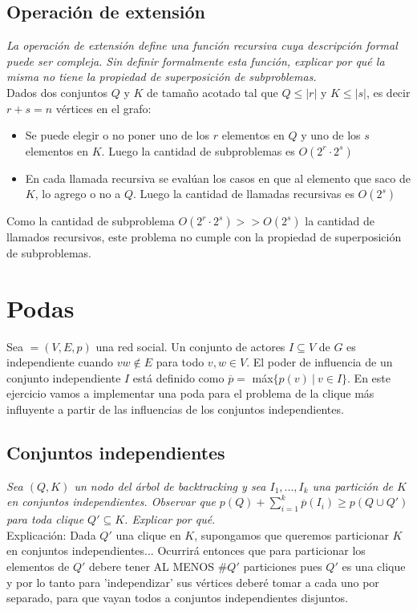 \documentclass[10pt, a4paper]{article}
\begin{document}
\subsection{Operación de extensión}
\emph{La operación de extensión define una función recursiva cuya descripción formal puede ser compleja. Sin definir formalmente esta función, explicar por qué la misma no tiene la propiedad de
superposición de subproblemas.} \\

Dados dos conjuntos $Q$ y $K$ de tamaño acotado tal que $Q \leq |r|$ y $K \leq |s|$, es decir $r+s = n$ vértices en el grafo:
\begin{itemize}
\item Se puede elegir o no poner uno de los $r$ elementos en $Q$ y uno de los $s$ elementos en $K$. Luego la cantidad de subproblemas es $O(2^r \cdot 2^s)$
\item En cada llamada recursiva se evalúan los casos en que al elemento que saco de $K$, lo agrego o no a $Q$. Luego la cantidad de llamadas recursivas es $O(2^s)$
\end{itemize}

Como la cantidad de subproblema $O(2^r \cdot 2^s) >> O(2^s)$ la cantidad de llamados recursivos, este problema no cumple con la propiedad de superposición de subproblemas.

\section{Podas}
Sea $ = (V, E, p)$ una red social. Un conjunto de actores $I \subseteq V$ de $G$ es independiente cuando
$vw \notin E$ para todo $v, w \in V$. El poder de influencia de un conjunto independiente $I$ está definido como
$\overline{p} =$ máx$\{p(v) \ | \ v \in I\}$. En este ejercicio vamos a implementar una poda para el problema de la
clique más influyente a partir de las influencias de los conjuntos independientes.

\subsection{Conjuntos independientes}
\emph{Sea $(Q, K)$ un nodo del \'arbol de backtracking y sea
$I_1 , . . . , I_k$ una partición de $K$ en conjuntos independientes. Observar que $p(Q) + \sum_{i=1}^{k} \overline{p}(I_i) \geq p(Q \cup Q')$ para toda clique $Q' \subseteq K$. Explicar por qu\'e.}\\

Explicaci\'on: Dada $Q'$ una clique en $K$, supongamos que queremos particionar $K$ en conjuntos independientes... Ocurrir\'a entonces que para particionar los elementos de $Q'$ debere tener AL MENOS $\#Q'$ particiones pues $Q'$ es una clique y por lo tanto para 'independizar' sus v\'ertices deber\'e tomar a cada uno por separado, para que vayan todos a conjuntos independientes disjuntos.
\end{document}
